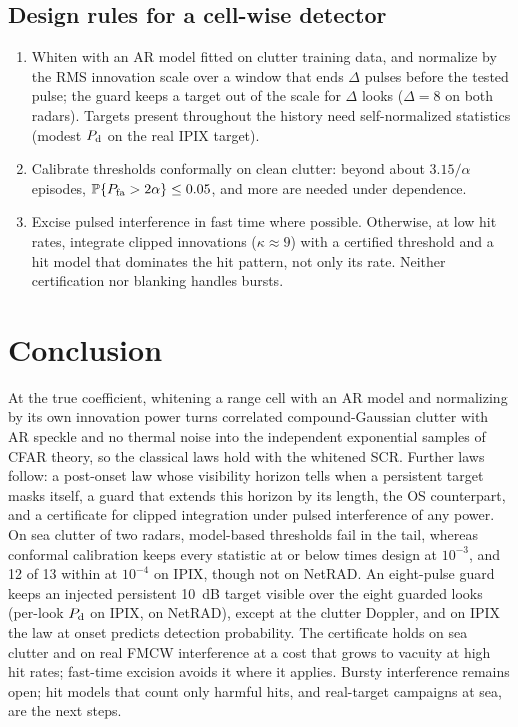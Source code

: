\documentclass[journal]{IEEEtran}
\newcommand{\PP}{\mathbb{P}}
\begin{document}
\subsection{Design rules for a cell-wise detector}
\begin{enumerate}[leftmargin=*,itemsep=0pt]
\item Whiten with an AR model fitted on clutter training data, and normalize by the RMS innovation scale over a window that ends $\Delta$ pulses before the tested pulse; the guard keeps a target out of the scale for $\Delta$ looks ($\Delta=8$ on both radars). Targets present throughout the history need self-normalized statistics (modest $P_{\rm d}$ on the real IPIX target).
\item Calibrate thresholds conformally on clean clutter: beyond about $3.15/\alpha$ episodes, $\PP\{P_{\rm fa}>2\alpha\}\le0.05$, and more are needed under dependence.
\item Excise pulsed interference in fast time where possible. Otherwise, at low hit rates, integrate clipped innovations ($\kappa\approx9$) with a certified threshold and a hit model that dominates the hit pattern, not only its rate. Neither certification nor blanking handles bursts.
\end{enumerate}

\section{Conclusion}
At the true coefficient, whitening a range cell with an AR model and normalizing by its own innovation power turns correlated compound-Gaussian clutter with AR speckle and no thermal noise into the independent exponential samples of CFAR theory, so the classical laws hold with the whitened SCR. Further laws follow: a post-onset law whose visibility horizon tells when a persistent target masks itself, a guard that extends this horizon by its length, the OS counterpart, and a certificate for clipped integration under pulsed interference of any power. On sea clutter of two radars, model-based thresholds fail in the tail, whereas conformal calibration keeps every statistic at or below \NetConfMaxThree{} times design at $10^{-3}$, and 12 of 13 within \LConfMaxFour{} at $10^{-4}$ on IPIX, though not on NetRAD. An eight-pulse guard keeps an injected persistent 10~dB target visible over the eight guarded looks (per-look $P_{\rm d}$ \GuardMeanLookEight{} on IPIX, \NetGuardEight{} on NetRAD), except at the clutter Doppler, and on IPIX the law at onset predicts detection probability. The certificate holds on sea clutter and on real FMCW interference at a cost that grows to vacuity at high hit rates; fast-time excision avoids it where it applies. Bursty interference remains open; hit models that count only harmful hits, and real-target campaigns at sea, are the next steps.
\end{document}
